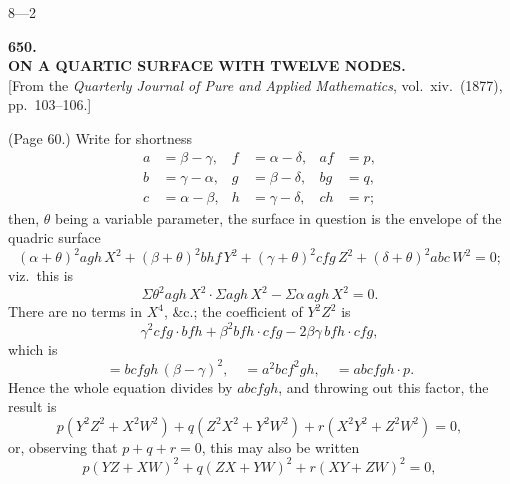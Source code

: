 \documentclass[11pt,a4paper]{article}
\begin{document}
\hfill 8---2

\newpage


\begin{center}
{\Large\bfseries 650.}\\[1em]
{\large\bfseries ON A QUARTIC SURFACE WITH TWELVE NODES.}\\[0.5em]
[From the \textit{Quarterly Journal of Pure and Applied Mathematics}, vol.~xiv.\ (1877), pp.~103--106.]
\end{center}

\medskip

\noindent (Page 60.) Write for shortness
\begin{align*}
a &= \beta - \gamma, & f &= \alpha - \delta, & af &= p, \\
b &= \gamma - \alpha, & g &= \beta - \delta, & bg &= q, \\
c &= \alpha - \beta, & h &= \gamma - \delta, & ch &= r;
\end{align*}
then, $\theta$ being a variable parameter, the surface in question is the envelope of the quadric surface
\[
(\alpha + \theta)^2 agh\, X^2 + (\beta + \theta)^2 bhf\, Y^2 + (\gamma + \theta)^2 cfg\, Z^2 + (\delta + \theta)^2 abc\, W^2 = 0;
\]
viz.\ this is
\[
\Sigma \theta^2 agh\, X^2 \cdot \Sigma agh\, X^2 - \Sigma\alpha\, agh\, X^2 = 0.
\]
There are no terms in $X^4$, \&c.; the coefficient of $Y^2 Z^2$ is
\[
\gamma^2 cfg \cdot bfh + \beta^2 bfh \cdot cfg - 2\beta\gamma\, bfh \cdot cfg,
\]
which is
\[
= bcfgh\, (\beta - \gamma)^2,\quad = a^2 bcf^2 gh,\quad = abcfgh \cdot p.
\]
Hence the whole equation divides by $abcfgh$, and throwing out this factor, the result is
\[
p(Y^2 Z^2 + X^2 W^2) + q(Z^2 X^2 + Y^2 W^2) + r(X^2 Y^2 + Z^2 W^2) = 0,
\]
or, observing that $p + q + r = 0$, this may also be written
\[
p(YZ + XW)^2 + q(ZX + YW)^2 + r(XY + ZW)^2 = 0,
\]

\bigskip
\end{document}
